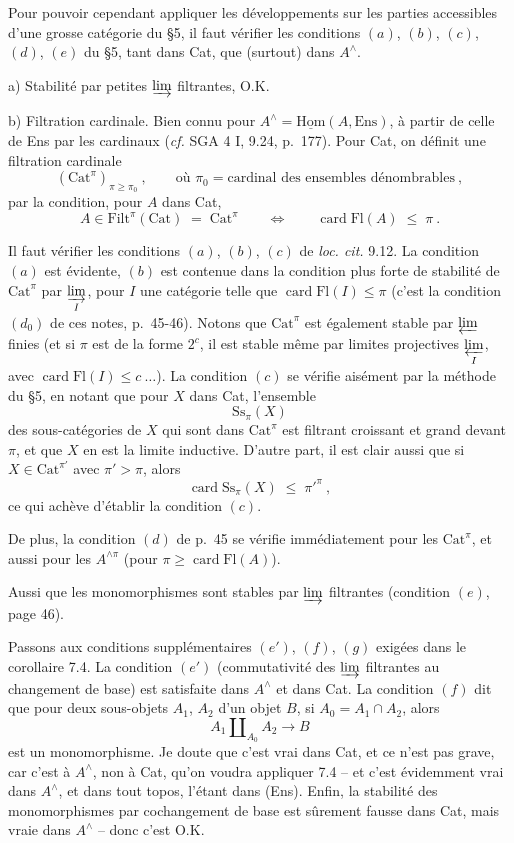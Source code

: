 \documentclass[11pt]{article}
\newcommand{\printedpage}[1]{\marginpar{\footnotesize p.~#1}}
\newcommand{\msp}[1]{\marginpar{\footnotesize [#1]}}
\newcommand{\Fl}{\mathrm{Fl}}
\newcommand{\Cat}{\mathrm{Cat}}
\newcommand{\chap}{^{\wedge}}
\begin{document}
Pour pouvoir cependant appliquer les développements sur les parties accessibles d'une grosse catégorie du §5, il faut vérifier les conditions $(a)$, $(b)$, $(c)$, $(d)$, $(e)$ du §5, tant dans Cat, que (surtout) dans $A\chap$.

a) Stabilité par petites $\varinjlim$ filtrantes, O.K.

b) Filtration cardinale. Bien connu pour $A\chap = \underline{\mathrm{Hom}}(A,\mathrm{Ens})$, à partir de celle de Ens par les cardinaux (\textit{cf.} SGA 4 I, 9.24, p.~177). Pour Cat, on définit une filtration cardinale
\[
(\Cat^{\pi})_{\pi\geq\pi_0}\ , \qquad \text{où } \pi_0 = \text{cardinal des ensembles dénombrables}\ ,
\tag*{(8.3)}
\]
\printedpage{56}
\msp{page 101}
par la condition, pour $A$ dans Cat,
\[
A\in \mathrm{Filt}^{\pi}(\Cat) \;=\; \Cat^{\pi} \qquad\Longleftrightarrow\qquad \operatorname{card}\Fl(A) \;\leq\; \pi\ .
\tag*{(8.4)}
\]

Il faut vérifier les conditions $(a)$, $(b)$, $(c)$ de \textit{loc. cit.} 9.12. La condition $(a)$ est évidente, $(b)$ est contenue dans la condition plus forte de stabilité de $\Cat^{\pi}$ par $\varinjlim\limits_{I}$, pour $I$ une catégorie telle que $\operatorname{card}\Fl(I)\leq\pi$ (c'est la condition $(d_0)$ de ces notes, p.~45-46). Notons que $\Cat^{\pi}$ est également stable par $\varprojlim$ finies (et si $\pi$ est de la forme $2^c$, il est stable même par limites projectives $\varprojlim\limits_{I}$, avec $\operatorname{card}\Fl(I)\leq c\ \ldots$). La condition $(c)$ se vérifie aisément par la méthode du §5, en notant que pour $X$ dans Cat, l'ensemble
\[
\mathrm{Ss}_{\pi}(X)
\]
des sous-catégories de $X$ qui sont dans $\Cat^{\pi}$ est filtrant croissant et grand devant $\pi$, et que $X$ en est la limite inductive. D'autre part, il est clair aussi que si $X\in\Cat^{\pi'}$ avec $\pi'>\pi$, alors
\[
\operatorname{card}\mathrm{Ss}_{\pi}(X) \;\leq\; \pi'^{\pi}\ ,
\]
ce qui achève d'établir la condition $(c)$.

De plus, la condition $(d)$ de p.~45 se vérifie immédiatement pour les $\Cat^{\pi}$, et aussi pour les $A^{\wedge\pi}$ (pour $\pi\geq\operatorname{card}\Fl(A)$).

Aussi que les monomorphismes sont stables par $\varinjlim$ filtrantes (condition $(e)$, page 46).

\msp{page 102}
Passons aux conditions supplémentaires $(e')$, $(f)$, $(g)$ exigées dans le corollaire 7.4. La condition $(e')$ (commutativité des $\varinjlim$ filtrantes au changement de base) est satisfaite dans $A\chap$ et dans Cat. La condition $(f)$ dit que pour deux sous-objets $A_1$, $A_2$ d'un objet $B$, si $A_0=A_1\cap A_2$, alors
\[
A_1\amalg_{A_0}A_2 \longrightarrow B
\]
est un monomorphisme. Je doute que c'est vrai dans Cat, et ce n'est pas grave, car c'est à $A\chap$, non à Cat, qu'on voudra appliquer 7.4 -- et c'est évidemment vrai dans $A\chap$, et dans tout topos, l'étant dans (Ens). Enfin, la stabilité des monomorphismes par cochangement de base est sûrement fausse dans Cat, mais vraie dans $A\chap$ -- donc c'est O.K.
\end{document}
